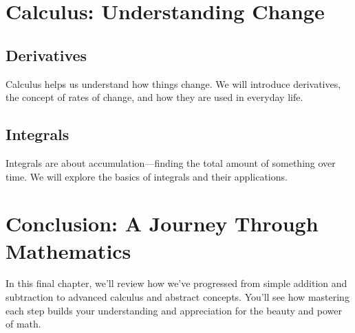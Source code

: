 \documentclass{book}
\begin{document}
\chapter{Calculus: Understanding Change}
\section{Derivatives}
Calculus helps us understand how things change. We will introduce derivatives, the concept of rates of change, and how they are used in everyday life.

\section{Integrals}
Integrals are about accumulation—finding the total amount of something over time. We will explore the basics of integrals and their applications.

\chapter{Conclusion: A Journey Through Mathematics}
In this final chapter, we’ll review how we’ve progressed from simple addition and subtraction to advanced calculus and abstract concepts. You’ll see how mastering each step builds your understanding and appreciation for the beauty and power of math.
\
\end{document}
